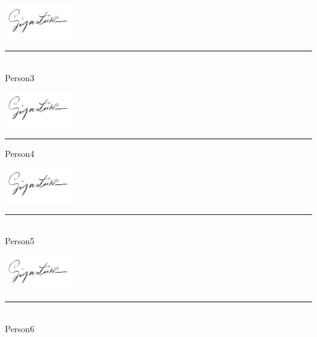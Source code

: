 \vfill\noindent
\begin{minipage}[b]{0.45\textwidth}
 \centering
 \includegraphics[height=1.5cm]{Include/Frontmatter/Signatures/Signature.png}
 \textcolor{AAUgrey1}{\rule{\textwidth}{0.75pt}}\\
  Person3\\
 {\footnotesize {}}
\end{minipage}
\hfill
\begin{minipage}[b]{0.45\textwidth}
 \centering
 \includegraphics[height=1.5cm]{Include/Frontmatter/Signatures/Signature.png}
 \textcolor{AAUgrey1}{\rule{\textwidth}{0.75pt}}
  Person4\\
 {\footnotesize {}}
\end{minipage}

\vfill\noindent
\begin{minipage}[b]{0.45\textwidth}
 \centering
 \includegraphics[height=1.5cm]{Include/Frontmatter/Signatures/Signature.PNG}
 \textcolor{AAUgrey1}{\rule{\textwidth}{0.75pt}}\\
  Person5\\
 {\footnotesize {}}
\end{minipage}
\hfill
\begin{minipage}[b]{0.45\textwidth}
 \centering
 \includegraphics[height=1.5cm]{Include/Frontmatter/Signatures/Signature.png}
 \textcolor{AAUgrey1}{\rule{\textwidth}{0.75pt}}\\
  Person6\\
 {\footnotesize {}}
\end{minipage}

\vfill\vfill\noindent\endgroup